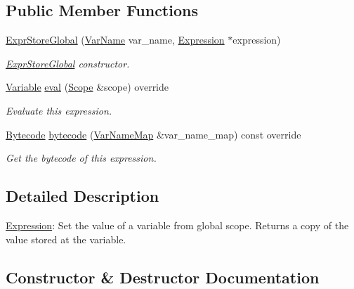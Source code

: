 \subsection*{Public Member Functions}
\begin{DoxyCompactItemize}
\item 
\hyperlink{classcreek_1_1_expr_store_global_a5da01c59839b9497f1046ce215f34aac}{Expr\+Store\+Global} (\hyperlink{classcreek_1_1_var_name}{Var\+Name} var\+\_\+name, \hyperlink{classcreek_1_1_expression}{Expression} $\ast$expression)
\begin{DoxyCompactList}\small\item\em {\ttfamily \hyperlink{classcreek_1_1_expr_store_global}{Expr\+Store\+Global}} constructor. \end{DoxyCompactList}\item 
\hyperlink{classcreek_1_1_variable}{Variable} \hyperlink{classcreek_1_1_expr_store_global_a6d155c6e9892a9691963bc1008cf21e4}{eval} (\hyperlink{classcreek_1_1_scope}{Scope} \&scope) override
\begin{DoxyCompactList}\small\item\em Evaluate this expression. \end{DoxyCompactList}\item 
\hyperlink{classcreek_1_1_bytecode}{Bytecode} \hyperlink{classcreek_1_1_expr_store_global_a1f0ae6afda0f9faacb80a2fbbc9c0e08}{bytecode} (\hyperlink{classcreek_1_1_var_name_map}{Var\+Name\+Map} \&var\+\_\+name\+\_\+map) const  override\hypertarget{classcreek_1_1_expr_store_global_a1f0ae6afda0f9faacb80a2fbbc9c0e08}{}\label{classcreek_1_1_expr_store_global_a1f0ae6afda0f9faacb80a2fbbc9c0e08}

\begin{DoxyCompactList}\small\item\em Get the bytecode of this expression. \end{DoxyCompactList}\end{DoxyCompactItemize}


\subsection{Detailed Description}
\hyperlink{classcreek_1_1_expression}{Expression}\+: Set the value of a variable from global scope. Returns a copy of the value stored at the variable. 

\subsection{Constructor \& Destructor Documentation}
